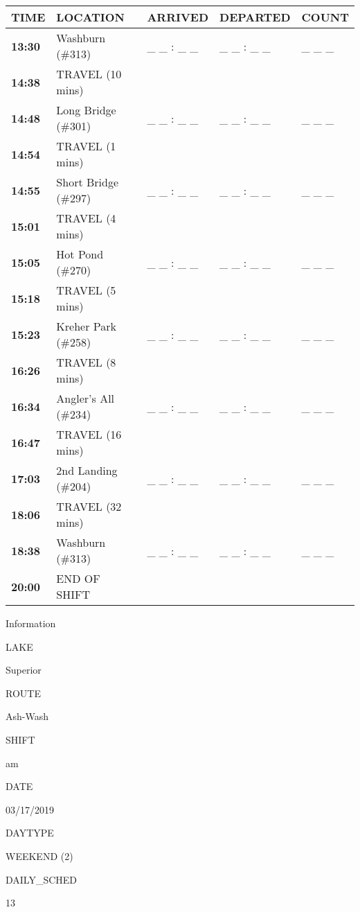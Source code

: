 \documentclass[]{article}
\begin{document}
\begin{tabular}{>{\bfseries}lllll}
\toprule
\textbf{TIME} & \textbf{LOCATION} & \textbf{ARRIVED} & \textbf{DEPARTED} & \textbf{COUNT}\\
\midrule
13:30 & Washburn (\#313) & \_ \_ : \_ \_ & \_ \_ : \_ \_ & \_ \_ \_\\
14:38 & TRAVEL (10 mins) &  &  & \\
14:48 & Long Bridge (\#301) & \_ \_ : \_ \_ & \_ \_ : \_ \_ & \_ \_ \_\\
14:54 & TRAVEL (1 mins) &  &  & \\
14:55 & Short Bridge (\#297) & \_ \_ : \_ \_ & \_ \_ : \_ \_ & \_ \_ \_\\
15:01 & TRAVEL (4 mins) &  &  & \\
15:05 & Hot Pond (\#270) & \_ \_ : \_ \_ & \_ \_ : \_ \_ & \_ \_ \_\\
15:18 & TRAVEL (5 mins) &  &  & \\
15:23 & Kreher Park (\#258) & \_ \_ : \_ \_ & \_ \_ : \_ \_ & \_ \_ \_\\
16:26 & TRAVEL (8 mins) &  &  & \\
16:34 & Angler's All (\#234) & \_ \_ : \_ \_ & \_ \_ : \_ \_ & \_ \_ \_\\
16:47 & TRAVEL (16 mins) &  &  & \\
17:03 & 2nd Landing (\#204) & \_ \_ : \_ \_ & \_ \_ : \_ \_ & \_ \_ \_\\
18:06 & TRAVEL (32 mins) &  &  & \\
18:38 & Washburn (\#313) & \_ \_ : \_ \_ & \_ \_ : \_ \_ & \_ \_ \_\\
20:00 & END OF SHIFT &  &  & \\
\bottomrule
\end{tabular}\newpage

Information

LAKE

Superior

ROUTE

Ash-Wash

SHIFT

am

DATE

03/17/2019

DAYTYPE

WEEKEND (2)

DAILY\_SCHED

13

\vspace{24pt}
\end{document}
